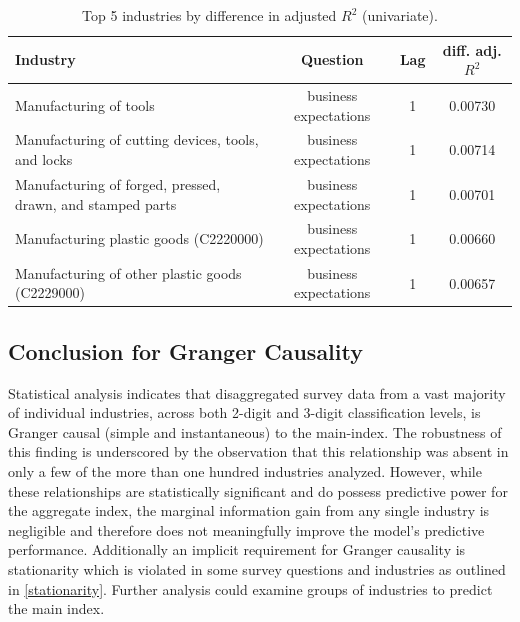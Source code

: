 \renewcommand{\arraystretch}{1.3}
\begin{table}[H]
\small
\centering
\begin{tabularx}{\textwidth}{X c c c}
\toprule
\textbf{Industry} & \textbf{Question} & \textbf{Lag} & \textbf{diff. adj. $R^2$} \\
\midrule
Manufacturing of tools      & business expectations      & 1   & 0.00730      \\
Manufacturing of cutting devices, tools, and locks       & business expectations      & 1   & 0.00714      \\
Manufacturing of forged, pressed, drawn, and stamped parts       & business expectations      & 1   & 0.00701      \\
Manufacturing plastic goods (C2220000)       & business expectations      & 1   & 0.00660      \\
Manufacturing of other plastic goods (C2229000)     & business expectations      & 1   & 0.00657      \\
\bottomrule
\end{tabularx}
\caption{Top 5 industries by difference in adjusted $R^2$ (univariate).}
\end{table}





\subsection{Conclusion for Granger Causality}
Statistical analysis indicates that disaggregated survey data from a vast majority of individual industries, across both 2-digit and 3-digit classification levels, is Granger causal (simple and instantaneous) to the main-index. The robustness of this finding is underscored by the observation that this relationship was absent in only a few of the more than one hundred industries analyzed. However, while these relationships are statistically significant and do possess predictive power for the aggregate index, the marginal information gain from any single industry is negligible and therefore does not meaningfully improve the model's predictive performance. Additionally an implicit requirement for Granger causality is stationarity which is violated in some survey questions and industries as outlined in \ref{stationarity}. Further analysis could examine groups of industries to predict the main index.